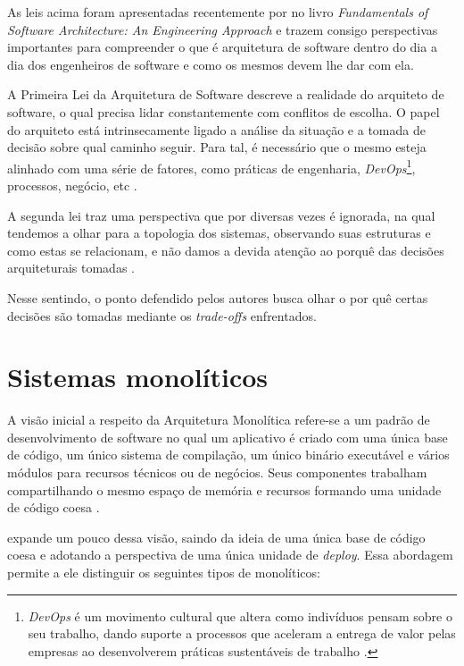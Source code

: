 As leis acima foram apresentadas recentemente por 
no livro \textit{Fundamentals of Software Architecture: An Engineering Approach} e trazem consigo
perspectivas importantes para compreender o que é arquitetura de software dentro do dia a dia dos
engenheiros de software e como os mesmos devem lhe dar com ela.

A Primeira Lei da Arquitetura de Software descreve a realidade do arquiteto de
software, o qual precisa lidar constantemente com conflitos de escolha. O papel do arquiteto está
intrinsecamente ligado a análise da situação e a tomada de decisão sobre qual caminho seguir. Para
tal, é necessário que o mesmo esteja alinhado com uma série de fatores, como práticas de engenharia,
\textit{DevOps}\footnote{\textit{DevOps} é um movimento cultural que altera como indivíduos pensam
sobre o seu trabalho, dando suporte a processos que aceleram a entrega de valor pelas empresas ao
desenvolverem práticas sustentáveis de trabalho \cite{davis2016effective}.}, processos, negócio, etc
\cite{Richards2020:FundamentalsOfSoftwareArchitecture}.

A segunda lei traz uma perspectiva que por diversas vezes é ignorada, na qual tendemos a olhar para
a topologia dos sistemas, observando suas estruturas e como estas se relacionam, e não damos a devida
atenção ao porquê das decisões arquiteturais tomadas \cite{Richards2020:FundamentalsOfSoftwareArchitecture}.

Nesse sentindo, o ponto defendido pelos autores busca olhar o por quê certas decisões são
tomadas mediante os \textit{trade-offs} enfrentados.

\section{Sistemas monolíticos}

A visão inicial a respeito da Arquitetura Monolítica refere-se a um padrão de desenvolvimento
de software no qual um aplicativo é criado com uma única base de código, um único sistema de compilação,
um único binário executável e vários módulos para recursos técnicos ou de negócios. Seus componentes
trabalham compartilhando o mesmo espaço de memória e recursos formando uma unidade de
código coesa \cite{NatalliaSakovich}.

 expande um pouco dessa visão, saindo da ideia de uma única base
de código coesa e adotando a perspectiva de uma única unidade de \textit{deploy}. Essa abordagem
permite a ele distinguir os seguintes tipos de monolíticos:

